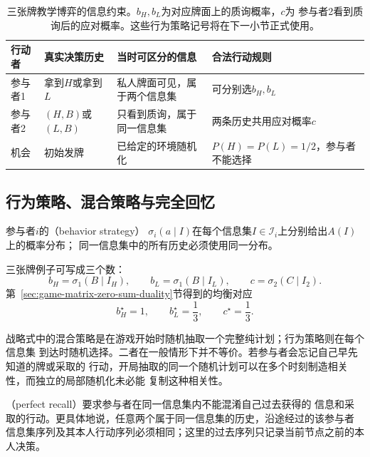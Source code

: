 \begin{table}[htbp]
  \centering
  \begin{tabularx}{\linewidth}{lXXX}
    \toprule
    行动者 & 真实决策历史 & 当时可区分的信息 & 合法行动规则\\
    \midrule
    参与者1 & 拿到$H$或拿到$L$ & 私人牌面可见，属于两个信息集 & 可分别选$b_H,b_L$\\
    参与者2 & $(H,B)$或$(L,B)$ & 只看到质询，属于同一信息集 & 两条历史共用应对概率$c$\\
    机会 & 初始发牌 & 已给定的环境随机化 & $P(H)=P(L)=1/2$，参与者不能选择\\
    \bottomrule
  \end{tabularx}
  \caption{三张牌教学博弈的信息约束。$b_H,b_L$为对应牌面上的质询概率，$c$为
  参与者2看到质询后的应对概率。这些行为策略记号将在下一小节正式使用。}
  \label{tab:game-card-information}
\end{table}

\subsection{行为策略、混合策略与完全回忆}

\begin{definition}[行为策略]
\label{def:game-behavior-strategy}
参与者\(i\)的（behavior strategy）
\(\sigma_i(a\mid I)\)在每个信息集\(I\in\mathcal{I}_i\)上分别给出$A(I)$上的概率分布；
同一信息集中的所有历史必须使用同一分布。
\end{definition}
三张牌例子可写成三个数：
\[
  b_H=\sigma_1(B\mid I_H),\qquad
  b_L=\sigma_1(B\mid I_L),\qquad
  c=\sigma_2(C\mid I_2).
\]
第~\ref{sec:game-matrix-zero-sum-duality}节得到的均衡对应
\[
  b_H^\star=1,\qquad b_L^\star=\frac13,\qquad c^\star=\frac13.
\]

战略式中的混合策略是在游戏开始时随机抽取一个完整纯计划；行为策略则在每个信息集
到达时随机选择。二者在一般情形下并不等价。若参与者会忘记自己早先知道的牌或采取的
行动，开局抽取的同一个随机计划可以在多个时刻制造相关性，而独立的局部随机化未必能
复制这种相关性。

\begin{definition}[完全回忆]
\label{def:game-perfect-recall}
（perfect recall）要求参与者在同一信息集内不能混淆自己过去获得的
信息和采取的行动。更具体地说，任意两个属于同一信息集的历史，沿途经过的该参与者
信息集序列及其本人行动序列必须相同；这里的过去序列只记录当前节点之前的本人决策。
\end{definition}

